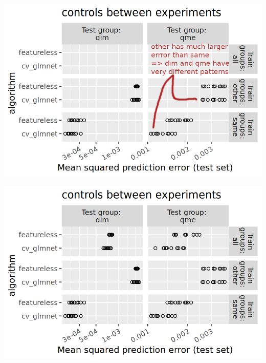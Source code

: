 \documentclass{beamer}
\begin{document}
\begin{frame}
  \includegraphics[width=\textwidth]{qsip_pc2_all_new-controls.between.experiments.other.ann.png}
\end{frame}

\begin{frame}
  \includegraphics[width=\textwidth]{qsip_pc2_all_new-controls.between.experiments.all.png}
\end{frame}
\end{document}
